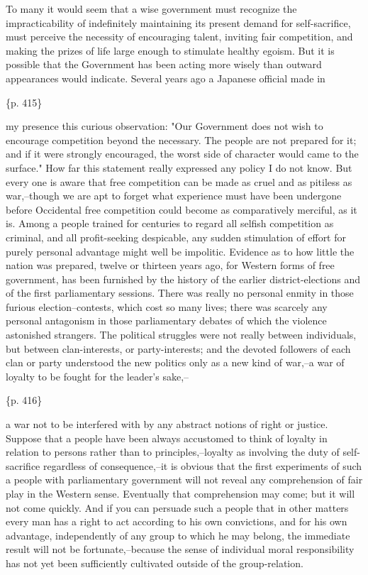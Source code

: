 To many it would seem that a wise government must recognize the impracticability of indefinitely maintaining its present demand for self-sacrifice, must perceive the necessity of encouraging talent, inviting fair competition, and making the prizes of life large enough to stimulate healthy egoism. But it is possible that the Government has been acting more wisely than outward appearances would indicate. Several years ago a Japanese official made in

\{p. 415\}

my presence this curious observation: "Our Government does not wish to encourage competition beyond the necessary. The people are not prepared for it; and if it were strongly encouraged, the worst side of character would came to the surface." How far this statement really expressed any policy I do not know. But every one is aware that free competition can be made as cruel and as pitiless as war,--though we are apt to forget what experience must have been undergone before Occidental free competition could become as comparatively merciful, as it is. Among a people trained for centuries to regard all selfish competition as criminal, and all profit-seeking despicable, any sudden stimulation of effort for purely personal advantage might well be impolitic. Evidence as to how little the nation was prepared, twelve or thirteen years ago, for Western forms of free government, has been furnished by the history of the earlier district-elections and of the first parliamentary sessions. There was really no personal enmity in those furious election--contests, which cost so many lives; there was scarcely any personal antagonism in those parliamentary debates of which the violence astonished strangers. The political struggles were not really between individuals, but between clan-interests, or party-interests; and the devoted followers of each clan or party understood the new politics only as a new kind of war,--a war of loyalty to be fought for the leader's sake,--

\{p. 416\}

a war not to be interfered with by any abstract notions of right or justice. Suppose that a people have been always accustomed to think of loyalty in relation to persons rather than to principles,--loyalty as involving the duty of self-sacrifice regardless of consequence,--it is obvious that the first experiments of such a people with parliamentary government will not reveal any comprehension of fair play in the Western sense. Eventually that comprehension may come; but it will not come quickly. And if you can persuade such a people that in other matters every man has a right to act according to his own convictions, and for his own advantage, independently of any group to which he may belong, the immediate result will not be fortunate,--because the sense of individual moral responsibility has not yet been sufficiently cultivated outside of the group-relation.



